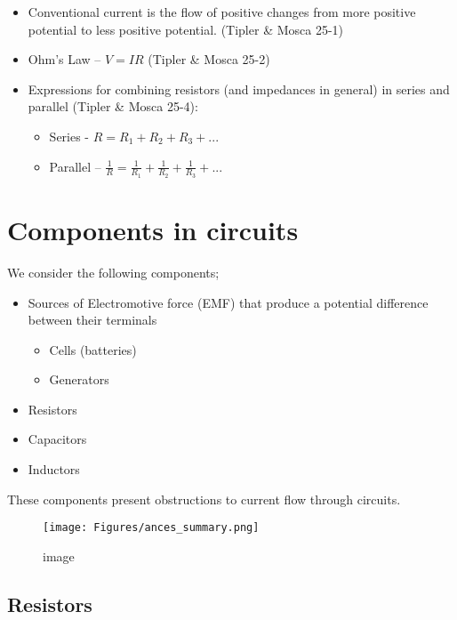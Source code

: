 \documentclass[
]{book}
\theoremstyle{definition}
\theoremstyle{definition}
\theoremstyle{definition}
\theoremstyle{definition}
\theoremstyle{remark}
\begin{document}
\begin{itemize}
\item
  Conventional current is the flow of positive changes from more
  positive potential to less positive potential. (Tipler \& Mosca 25-1)
\item
  Ohm's Law -- \(V = IR\) (Tipler \& Mosca 25-2)
\item
  Expressions for combining resistors (and impedances in general) in
  series and parallel (Tipler \& Mosca 25-4):

  \begin{itemize}
  \item
    Series - \(R = R_1 + R_2+ R_3 + ...\)
  \item
    Parallel --
    \(\frac{1}{R} = \frac{1}{R_1} + \frac{1}{R_2} + \frac{1}{R_3} + ...\)
  \end{itemize}
\end{itemize}

\hypertarget{components-in-circuits}{%
\section{Components in circuits}\label{components-in-circuits}}

We consider the following components;

\begin{itemize}
\item
  Sources of Electromotive force (EMF) that produce a potential
  difference between their terminals

  \begin{itemize}
  \item
    Cells (batteries)
  \item
    Generators
  \end{itemize}
\item
  Resistors
\item
  Capacitors
\item
  Inductors
\end{itemize}

These components present obstructions to current flow through circuits.

\begin{figure}
\centering
\texttt{[image: Figures/ances\_summary.png]}
\caption{image}
\end{figure}

\hypertarget{resistors}{%
\subsection{Resistors}\label{resistors}}
\end{document}
